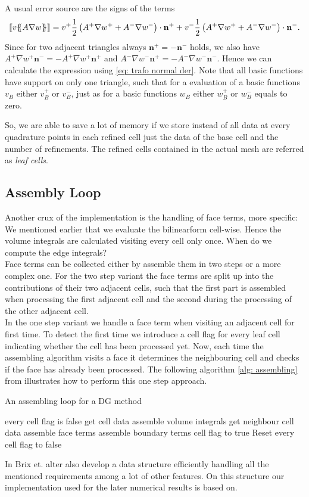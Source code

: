 \begin{example}
A usual error source are the signs of the terms
\[
	\llbracket v \{\!\!\{  A \nabla w  \}\!\!\} \rrbracket = v^+ \frac 1 2  \left(A^+ \nabla w^+ + A^- \nabla w^-\right) \cdot \mathbf n^+ + v^- \frac 1 2 \left(A^+ \nabla w^+ + A^- \nabla w^-\right) \cdot \mathbf n^-.
\]
Since for two adjacent triangles always $\mathbf n^+ = - \mathbf n^-$ holds, we also have $A^+ \nabla w^+ \mathbf n^-= -A^+ \nabla w^+ \mathbf n^+$ and $A^- \nabla w^- \mathbf n^+= -A^- \nabla w^- \mathbf n^-$. Hence we can calculate the expression using \ref{eq: trafo normal der}. Note that all basic functions have support on only one triangle, such that for a evaluation of a basic functions $v_B$ either $v_B^+$ or $v_B^-$, just as for a basic functions $w_B$ either $w_B^+$ or $w_B^-$ equals to zero.

So, we are able to save a lot of memory if we store instead of all data at every quadrature points in each refined cell just the data of the base cell and the number of refinements. The refined cells contained in the actual mesh are referred as \emph{leaf cells}.
\end{example}

\subsection{Assembly Loop}
Another crux of the implementation is the handling of face terms, more specific: We mentioned earlier that we evaluate the bilinearform cell-wise. Hence the volume integrals are calculated visiting every cell only once. When do we compute the edge integrals?\\
Face terms can be collected either by assemble them in two steps or a more complex one.
For the two step variant the face terms are split up into the contributions of their two adjacent cells, such that the first part is assembled when processing the first adjacent cell and the second during the processing of the other adjacent cell. \\
In the one step variant we handle a face term when visiting an adjacent cell for first time. To detect the first time we introduce a cell flag for every leaf cell indicating whether the cell has been processed yet. Now, each time the assembling algorithm visits a face it determines the neighbouring cell and checks if the face has already been processed. The following algorithm \ref{alg: assembling} from \cite{BMV2009} illustrates how to perform this one step approach. 
\begin{algorithm}[H]
\caption{An assembling loop for a DG method}
\label{alg: assembling}
\begin{algorithmic}
\Ensure every cell flag is false
\State get cell data
\State assemble volume integrals 
					\State get neighbour cell data
					\State assemble face terms
			\EndIf
		\Else
			\State assemble boundary terms
		\EndIf
\EndFor
	\State cell flag to true 
\EndFor
\State Reset every cell flag to false
\end{algorithmic}
\end{algorithm}

In \cite{BMV2009} Brix et. alter also develop a data structure efficiently handling all the mentioned requirements among a lot of other features. On this structure our implementation used for the later numerical results is based on.